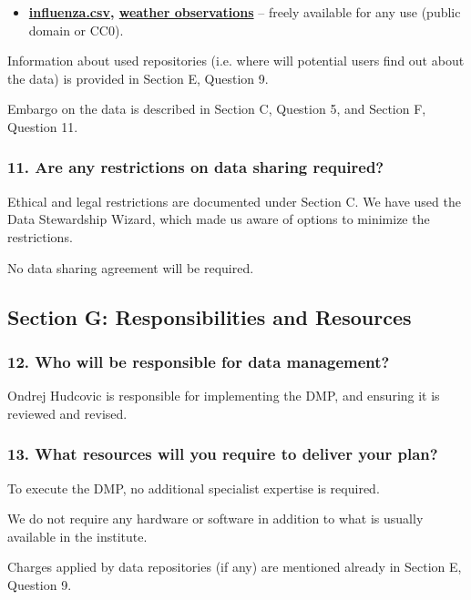 \documentclass[
]{article}
\providecommand{\tightlist}{%
  \setlength{\itemsep}{0pt}\setlength{\parskip}{0pt}}
\begin{document}
\begin{itemize}
\tightlist
\item
  \textbf{\href{https://www.data.gv.at/katalog/dataset/grippemeldedienst-stadt-wien}{influenza.csv}, \href{https://www.meteoblue.com/en/weather/archive/export/vienna_austria_2761369}{weather observations}} {--} freely available for
  any use (public domain or CC0).
\end{itemize}

Information about used repositories (i.e. where will potential users
find out about the data) is provided in Section E, Question 9.

Embargo on the data is described in Section C, Question 5, and Section
F, Question 11.

\hypertarget{q-restrictions}{}
\hypertarget{are-any-restrictions-on-data-sharing-required}{%
\subsubsection{11. Are any restrictions on data sharing
required?}\label{are-any-restrictions-on-data-sharing-required}}

Ethical and legal restrictions are documented under Section C. We have
used the Data Stewardship Wizard, which made us aware of options to
minimize the restrictions.

No data sharing agreement will be required.

\hypertarget{sec-responsibilities-resources}{}
\hypertarget{section-g-responsibilities-and-resources}{%
\subsection{Section G: Responsibilities and
Resources}\label{section-g-responsibilities-and-resources}}

\hypertarget{q-dm-responsible}{}
\hypertarget{who-will-be-responsible-for-data-management}{%
\subsubsection{12. Who will be responsible for data
management?}\label{who-will-be-responsible-for-data-management}}

Ondrej Hudcovic is responsible for implementing the DMP, and ensuring it
is reviewed and revised.

\hypertarget{q-required-resources}{}
\hypertarget{what-resources-will-you-require-to-deliver-your-plan}{%
\subsubsection{13. What resources will you require to deliver your
plan?}\label{what-resources-will-you-require-to-deliver-your-plan}}

To execute the DMP, no additional specialist expertise is required.

We do not require any hardware or software in addition to what is
usually available in the institute.

Charges applied by data repositories (if any) are mentioned already in
Section E, Question 9.
\end{document}

